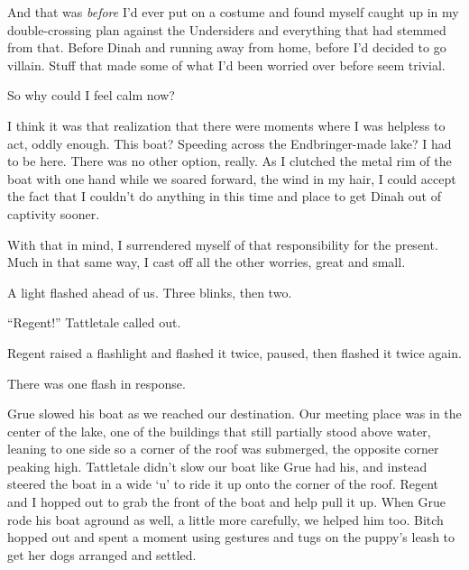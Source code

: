 And that was \emph{before} I'd ever put on a costume and found myself caught up in my double-crossing plan against the Undersiders and everything that had stemmed from that.  Before Dinah and running away from home, before I'd decided to go villain.  Stuff that made some of what I'd been worried over before seem trivial.



So why could I feel calm now?



I think it was that realization that there were moments where I was helpless to act, oddly enough.  This boat?  Speeding across the Endbringer-made lake?  I had to be here.  There was no other option, really.  As I clutched the metal rim of the boat with one hand while we soared forward, the wind in my hair, I could accept the fact that I couldn't do anything in this time and place to get Dinah out of captivity sooner.



With that in mind, I surrendered myself of that responsibility for the present.  Much in that same way, I cast off all the other worries, great and small.



A light flashed ahead of us.  Three blinks, then two.



``Regent!'' Tattletale called out.



Regent raised a flashlight and flashed it twice, paused, then flashed it twice again.



There was one flash in response.



Grue slowed his boat as we reached our destination.  Our meeting place was in the center of the lake, one of the buildings that still partially stood above water, leaning to one side so a corner of the roof was submerged, the opposite corner peaking high.  Tattletale didn't slow our boat like Grue had his, and instead steered the boat in a wide `u' to ride it up onto the corner of the roof.  Regent and I hopped out to grab the front of the boat and help pull it up.  When Grue rode his boat aground as well, a little more carefully, we helped him too.  Bitch hopped out and spent a moment using gestures and tugs on the puppy's leash to get her dogs arranged and settled.



